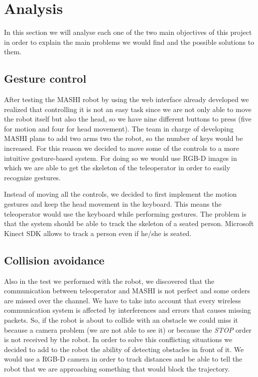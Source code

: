 \section{Analysis}
\label{sec:analysis}

In this section we will analyse each one of the two main objectives of this project in order to explain the main problems we would find and the possible solutions to them.

\subsection{Gesture control}

After testing the MASHI robot by using the web interface already developed we realized that controlling it is not an easy task since we are not only able to move the robot itself but also the head, so we have nine different buttons to press (five for motion and four for head movement). The team in charge of developing MASHI plans to add two arms two the robot, so the number of keys would be increased.
For this reason we decided to move some of the controls to a more intuitive gesture-based system. For doing so we would use RGB-D images in which we are able to get the skeleton of the teleoperator in order to easily recognize gestures.

Instead of moving all the controls, we decided to first implement the motion gestures and keep the head movement in the keyboard. This means the teleoperator would use the keyboard while performing gestures. The problem is that the system should be able to track the skeleton of a seated person. Microsoft Kinect SDK allows to track a person even if he/she is seated.


\subsection{Collision avoidance}

Also in the test we performed with the robot, we discovered that the communication between teleoperator and MASHI is not perfect and some orders are missed over the channel. We have to take into account that every wireless communication system is affected by interferences and errors that causes missing packets. So, if the robot is about to collide with an obstacle we could miss it because a camera problem (we are not able to see it) or because the \textit{STOP} order is not received by the robot. In order to solve this conflicting situations we decided to add to the robot the ability of detecting obstacles in front of it. We would use a RGB-D camera in order to track distances and be able to tell the robot that we are approaching something that would block the trajectory.
